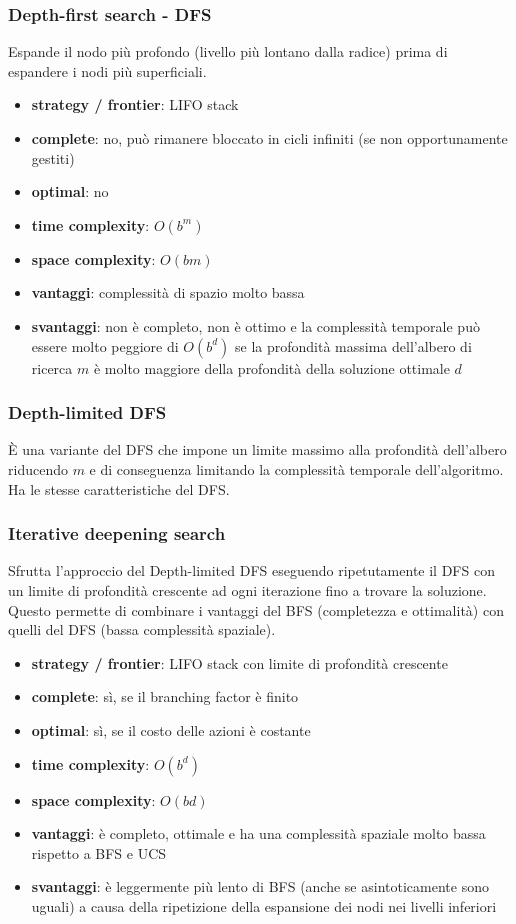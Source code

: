 \subsubsection*{Depth-first search - DFS}
Espande il nodo più profondo (livello più lontano dalla radice) prima di espandere i nodi più superficiali.
\begin{itemize}
	\item \textbf{strategy / frontier}: LIFO stack
	\item \textbf{complete}: no, può rimanere bloccato in cicli infiniti (se non opportunamente gestiti)
	\item \textbf{optimal}: no
	\item \textbf{time complexity}: \(O(b^{m})\)
	\item \textbf{space complexity}: \(O(bm)\)
	\item \textbf{vantaggi}: complessità di spazio molto bassa
	\item \textbf{svantaggi}: non è completo, non è ottimo e la complessità temporale può essere molto peggiore di \(O(b^{d})\)
	se la profondità massima dell'albero di ricerca \(m\) è molto maggiore della profondità della soluzione ottimale \(d\)
\end{itemize}

\subsubsection*{Depth-limited DFS}
È una variante del DFS che impone un limite massimo alla profondità dell'albero riducendo \(m\) e di conseguenza limitando
la complessità temporale dell'algoritmo. Ha le stesse caratteristiche del DFS.

\subsubsection*{Iterative deepening search}
Sfrutta l'approccio del Depth-limited DFS eseguendo ripetutamente il DFS con un limite di profondità crescente ad ogni iterazione
fino a trovare la soluzione. Questo permette di combinare i vantaggi del BFS (completezza e ottimalità) con quelli del DFS (bassa
complessità spaziale).
\begin{itemize}
	\item \textbf{strategy / frontier}: LIFO stack con limite di profondità crescente
	\item \textbf{complete}: sì, se il branching factor è finito
	\item \textbf{optimal}: sì, se il costo delle azioni è costante
	\item \textbf{time complexity}: \(O(b^{d})\)
	\item \textbf{space complexity}: \(O(bd)\)
	\item \textbf{vantaggi}: è completo, ottimale e ha una complessità spaziale molto bassa rispetto a BFS e UCS
	\item \textbf{svantaggi}: è leggermente più lento di BFS (anche se asintoticamente sono uguali) a causa della ripetizione
	della espansione dei nodi nei livelli inferiori
\end{itemize}

